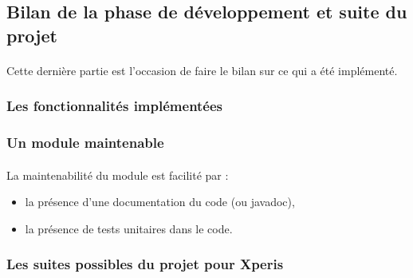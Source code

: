 			
			
	
	\subsection{Bilan de la phase de développement et suite du projet}
		\paragraph{}
		Cette dernière partie est l'occasion de faire le bilan sur ce qui a été
		implémenté.
		
		\subsubsection{Les fonctionnalités implémentées}
			\paragraph{}
		
		\subsubsection{Un module maintenable}
			\paragraph{}%
			La maintenabilité du module est facilité par :
			\begin{itemize}
			  \item la présence d'une documentation du code (ou javadoc),
			  \item la présence de tests unitaires dans le code.
			\end{itemize}
			
			\paragraph{}%
			
			\paragraph{}%
			
		\subsubsection{Les suites possibles du projet pour Xperis}
			\paragraph{}
			
			\paragraph{}
			